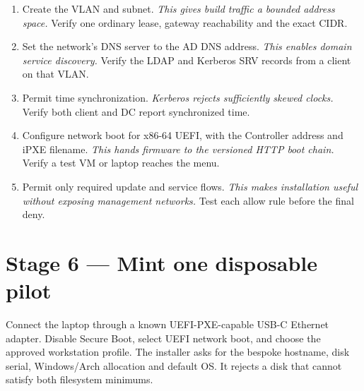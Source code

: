 \begin{enumerate}
\item Create the VLAN and subnet. \textit{This gives build traffic a bounded
address space.} Verify one ordinary lease, gateway reachability and the exact
CIDR.
\item Set the network's DNS server to the AD DNS address. \textit{This enables
domain service discovery.} Verify the LDAP and Kerberos SRV records from a
client on that VLAN.
\item Permit time synchronization. \textit{Kerberos rejects sufficiently
skewed clocks.} Verify both client and DC report synchronized time.
\item Configure network boot for x86-64 UEFI, with the Controller address and
iPXE filename. \textit{This hands firmware to the versioned HTTP boot chain.}
Verify a test VM or laptop reaches the menu.
\item Permit only required update and service flows. \textit{This makes
installation useful without exposing management networks.} Test each allow
rule before the final deny.
\end{enumerate}


\section{Stage 6 --- Mint one disposable pilot}

Connect the laptop through a known UEFI-PXE-capable USB-C Ethernet adapter.
Disable Secure Boot, select UEFI network boot, and choose the approved
workstation profile. The installer asks for the bespoke hostname, disk serial,
Windows/Arch allocation and default OS. It rejects a disk that cannot satisfy
both filesystem minimums.

\begin{center}
\end{center}

